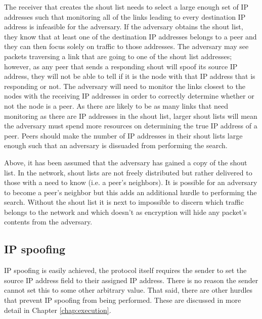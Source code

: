 \documentclass[ %
                    author={Luke Murray},
                supervisor={Dr. Simon Hollis},
                     title={Shadow Peer-to-Peer Networks},
                  subtitle={},
                    degree={MEng},
                      year={2013} ]{thesis}
\begin{document}
The receiver that creates the shout list needs to select a large enough set of IP addresses such that monitoring all of the links leading to every destination IP address is infeasible for the adversary. If the adversary obtains the shout list, they know that at least one of the destination IP addresses belongs to a peer and they can then focus solely on traffic to those addresses. The adversary may see packets traversing a link that are going to one of the shout list addresses; however, as any peer that sends a responding shout will spoof its source IP address, they will not be able to tell if it is the node with that IP address that is responding or not. The adversary will need to monitor the links closest to the nodes with the receiving IP addresses in order to correctly determine whether or not the node is a peer. As there are likely to be as many links that need monitoring as there are IP addresses in the shout list, larger shout lists will mean the adversary must spend more resources on determining the true IP address of a peer. Peers should make the number of IP addresses in their shout lists large enough such that an adversary is dissuaded from performing the search.

Above, it has been assumed that the adversary has gained a copy of the shout list. In the network, shout lists are not freely distributed but rather delivered to those with a need to know (i.e. a peer's neighbors). It is possible for an adversary to become a peer's neighbor but this adds an additional hurdle to performing the search. Without the shout list it is next to impossible to discern which traffic belongs to the network and which doesn't as encryption will hide any packet's contents from the adversary.

\subsection{IP spoofing}

IP spoofing is easily achieved, the protocol itself requires the sender to set the source IP address field to their assigned IP address. There is no reason the sender cannot set this to some other arbitrary value. That said, there are other hurdles that prevent IP spoofing from being performed. These are discussed in more detail in Chapter \ref{chap:execution}.
\end{document}
